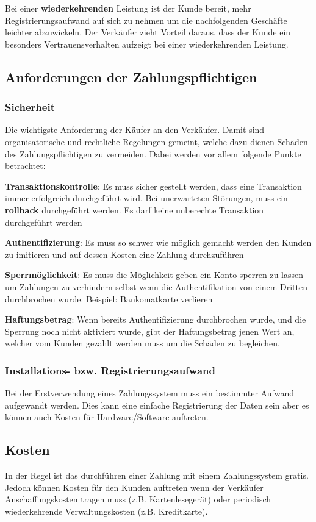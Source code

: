 Bei einer \textbf{wiederkehrenden} Leistung ist der Kunde bereit, mehr Registrierungsaufwand auf sich zu nehmen um die nachfolgenden Geschäfte leichter abzuwickeln. Der Verkäufer zieht Vorteil daraus, dass der Kunde ein besonders Vertrauensverhalten aufzeigt bei einer wiederkehrenden Leistung. 

\subsection{Anforderungen der Zahlungspflichtigen}
\subsubsection{Sicherheit}
Die wichtigste Anforderung der Käufer an den Verkäufer. Damit sind organisatorische und rechtliche Regelungen gemeint, welche dazu dienen Schäden des Zahlungspflichtigen zu vermeiden. Dabei werden vor allem folgende Punkte betrachtet:

\textbf{Transaktionskontrolle}: Es muss sicher gestellt werden, dass eine Transaktion immer erfolgreich durchgeführt wird. Bei unerwarteten Störungen, muss ein \textbf{rollback} durchgeführt werden. Es darf keine unberechte Transaktion durchgeführt werden

\textbf{Authentifizierung}: Es muss so schwer wie möglich gemacht werden den Kunden zu imitieren und auf dessen Kosten eine Zahlung durchzuführen

\textbf{Sperrmöglichkeit}: Es muss die Möglichkeit geben ein Konto sperren zu lassen um Zahlungen zu verhindern selbst wenn die Authentifikation von einem Dritten durchbrochen wurde. Beispiel: Bankomatkarte verlieren

\textbf{Haftungsbetrag}: Wenn bereits Authentifizierung durchbrochen wurde, und die Sperrung noch nicht aktiviert wurde, gibt der Haftungsbetrag jenen Wert an, welcher vom Kunden gezahlt werden muss um die Schäden zu begleichen.

\subsubsection{Installations- bzw. Registrierungsaufwand}
Bei der Erstverwendung eines Zahlungssystem muss ein bestimmter Aufwand aufgewandt werden. Dies kann eine einfache Registrierung der Daten sein aber es können auch Kosten für Hardware/Software auftreten.

\subsection{Kosten}
In der Regel ist das durchführen einer Zahlung mit einem Zahlungssystem gratis. Jedoch können Kosten für den Kunden auftreten wenn der Verkäufer Anschaffungskosten tragen muss (z.B. Kartenlesegerät) oder periodisch wiederkehrende Verwaltungskosten (z.B. Kreditkarte).

